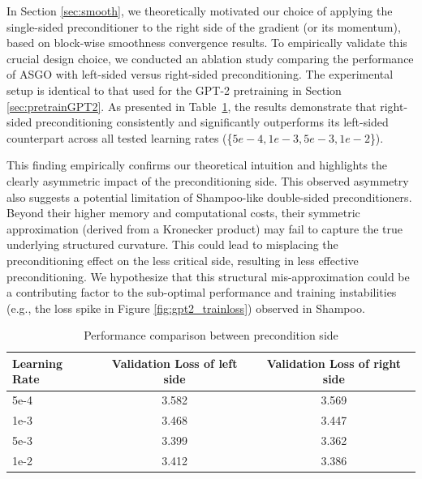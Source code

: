 \documentclass{article}
\theoremstyle{remark}
\begin{document}
In Section \ref{sec:smooth}, we theoretically motivated our choice of applying the single-sided preconditioner to the right side of the gradient (or its momentum), based on block-wise smoothness convergence results. To empirically validate this crucial design choice, we conducted an ablation study comparing the performance of ASGO with left-sided versus right-sided preconditioning.
The experimental setup is identical to that used for the GPT-2 pretraining in Section \ref{sec:pretrainGPT2}. As presented in Table~\ref{table:precondside_comparison}, the results demonstrate that right-sided preconditioning consistently and significantly outperforms its left-sided counterpart across all tested learning rates (\{$5e-4, 1e-3, 5e-3, 1e-2$\}).

This finding empirically confirms our theoretical intuition and highlights the clearly asymmetric impact of the preconditioning side. This observed asymmetry also suggests a potential limitation of Shampoo-like double-sided preconditioners. Beyond their higher memory and computational costs, their symmetric approximation (derived from a Kronecker product) may fail to capture the true underlying structured curvature.
This could lead to misplacing the preconditioning effect on the less critical side, resulting in less effective preconditioning. We hypothesize that this structural mis-approximation could be a contributing factor to the sub-optimal performance and training instabilities (e.g., the loss spike in Figure \ref{fig:gpt2_trainloss}) observed in Shampoo.
\begin{table}[h!]
    \centering
    \caption{Performance comparison between precondition side}
    \label{table:precondside_comparison}
    \begin{tabular}{lcc}
    \toprule
    \textbf{Learning Rate} & \textbf{Validation Loss of left side} & \textbf{Validation Loss of right side} \\
    \midrule
    5e-4 & 3.582 & 3.569 \\
    1e-3 & 3.468 & 3.447 \\
    5e-3 & 3.399 & 3.362 \\
    1e-2 & 3.412 & 3.386 \\
    \bottomrule
    \end{tabular}
    
\end{table}
\end{document}
